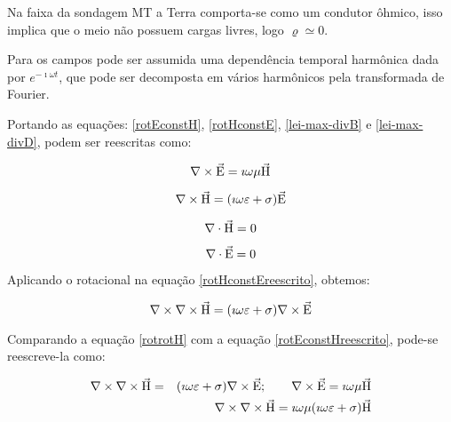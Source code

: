         Na faixa da sondagem MT a Terra comporta-se como um condutor ôhmico, isso implica que o meio não possuem cargas livres, logo $\varrho \simeq 0$. 
        
        Para os campos pode ser assumida uma dependência temporal harmônica dada por $e^{- \imath \omega t}$, que pode ser decomposta em vários harmônicos pela transformada de Fourier. 
    
        Portando as equações: \ref{rotEconstH}, \ref{rotHconstE}, \ref{lei-max-divB} e \ref{lei-max-divD}, podem ser reescritas como:
        
        \begin{equation}
            \label{rotEconstHreescrito}
            \nabla \times \vec{\textrm{E}} = \imath \omega \mu \vec{\textrm{H}}           
        \end{equation}
        
        \begin{equation}
            \label{rotHconstEreescrito}
            \nabla \times \vec{\textrm{H}} = (\imath \omega \varepsilon + \sigma) \vec{\textrm{E}}
        \end{equation}
        
        \begin{equation}
            \nabla \cdot \vec{\textrm{H}}  = 0
        \end{equation}

        \begin{equation}
            \nabla \cdot \vec{\textrm{E}} = 0
        \end{equation}

        Aplicando o rotacional na equação \ref{rotHconstEreescrito}, obtemos:
         
        \begin{equation}
            \label{rotrotH}
            \nabla \times \nabla \times \vec{\textrm{H}} = (\imath \omega \varepsilon + \sigma) \nabla \times \vec{\textrm{E}}
        \end{equation}

        Comparando a equação \ref{rotrotH} com a equação \ref{rotEconstHreescrito}, pode-se reescreve-la como:
        
        {\setlength\arraycolsep{2pt}
        \begin{eqnarray}
            \label{preHk}
            \nabla \times \nabla \times \vec{\textrm{H}} &=& (\imath \omega \varepsilon + \sigma) \nabla \times \vec{\textrm{E}}; \qquad \nabla \times \vec{\textrm{E}} = \imath \omega \mu \vec{\textrm{H}} \nonumber \\
            & &\nabla \times \nabla \times \vec{\textrm{H}} = \imath \omega \mu (\imath \omega \varepsilon + \sigma) \vec{\textrm{H}}            
        \end{eqnarray}}
        
